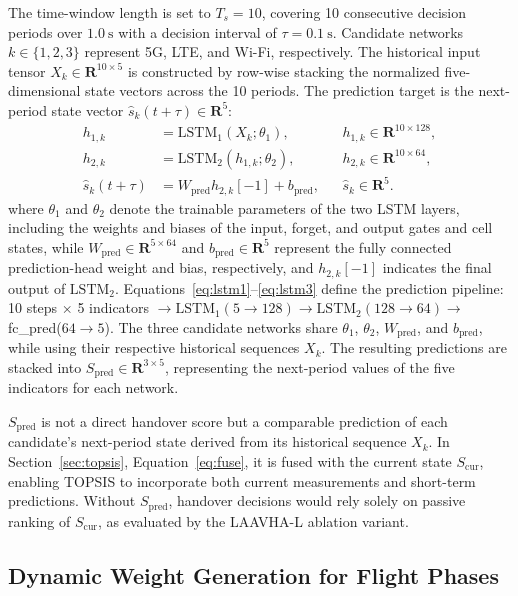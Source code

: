 \documentclass[remotesensing,article,submit,moreauthors]{Definitions/mdpi}
\begin{document}
The time-window length is set to $T_s=10$, covering 10 consecutive decision periods over $1.0~\mathrm{s}$ with a decision interval of $\tau=0.1~\mathrm{s}$. Candidate networks $k\in\{1,2,3\}$ represent 5G, LTE, and Wi-Fi, respectively. The historical input tensor $X_k\in\mathbf{R}^{10\times5}$ is constructed by row-wise stacking the normalized five-dimensional state vectors across the 10 periods. The prediction target is the next-period state vector $\hat{s}_k(t+\tau)\in\mathbf{R}^5$:
\begin{align}
h_{1,k} &= \mathrm{LSTM}_1(X_k;\theta_1), && h_{1,k}\in\mathbf{R}^{10\times128}, \label{eq:lstm1}\\
h_{2,k} &= \mathrm{LSTM}_2(h_{1,k};\theta_2), && h_{2,k}\in\mathbf{R}^{10\times64}, \label{eq:lstm2}\\
\hat{s}_k(t+\tau) &= W_{\mathrm{pred}}h_{2,k}[-1]+b_{\mathrm{pred}}, && \hat{s}_k\in\mathbf{R}^5. \label{eq:lstm3}
\end{align}
where $\theta_1$ and $\theta_2$ denote the trainable parameters of the two LSTM layers, including the weights and biases of the input, forget, and output gates and cell states, while $W_{\mathrm{pred}}\in\mathbf{R}^{5\times64}$ and $b_{\mathrm{pred}}\in\mathbf{R}^5$ represent the fully connected prediction-head weight and bias, respectively, and $h_{2,k}[-1]$ indicates the final output of $\mathrm{LSTM}_2$. Equations~\eqref{eq:lstm1}--\eqref{eq:lstm3} define the prediction pipeline: 10 steps $\times$ 5 indicators $\rightarrow\mathrm{LSTM}_1(5\rightarrow128)\rightarrow\mathrm{LSTM}_2(128\rightarrow64)\rightarrow$fc\_pred($64\rightarrow5$). The three candidate networks share $\theta_1$, $\theta_2$, $W_{\mathrm{pred}}$, and $b_{\mathrm{pred}}$, while using their respective historical sequences $X_k$. The resulting predictions are stacked into $S_{\mathrm{pred}}\in\mathbf{R}^{3\times5}$, representing the next-period values of the five indicators for each network.

$S_{\mathrm{pred}}$ is not a direct handover score but a comparable prediction of each candidate's next-period state derived from its historical sequence $X_k$. In Section~\ref{sec:topsis}, Equation~\eqref{eq:fuse}, it is fused with the current state $S_{\mathrm{cur}}$, enabling TOPSIS to incorporate both current measurements and short-term predictions. Without $S_{\mathrm{pred}}$, handover decisions would rely solely on passive ranking of $S_{\mathrm{cur}}$, as evaluated by the LAAVHA-L ablation variant.

\subsection{Dynamic Weight Generation for Flight Phases}\label{sec:weight}
\end{document}
